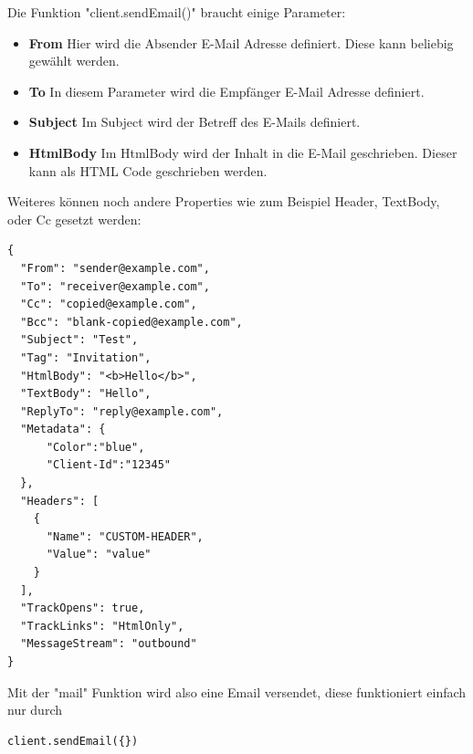 Die Funktion "client.sendEmail()" braucht einige Parameter:

\begin{itemize}
    \item \textbf{From}
        \newline
        Hier wird die Absender E-Mail Adresse definiert. Diese kann beliebig gewählt werden.
    \item \textbf{To}
        \newline
        In diesem Parameter wird die Empfänger E-Mail Adresse definiert.
    \item \textbf{Subject}
        \newline
        Im Subject wird der Betreff des E-Mails definiert.
    \item \textbf{HtmlBody}
        \newline
        Im HtmlBody wird der Inhalt in die E-Mail geschrieben. Dieser kann als HTML Code geschrieben werden.
\end{itemize}


Weiteres können noch andere Properties wie zum Beispiel Header, TextBody, oder Cc gesetzt werden:

\begin{lstlisting}
{
  "From": "sender@example.com",
  "To": "receiver@example.com",
  "Cc": "copied@example.com",
  "Bcc": "blank-copied@example.com",
  "Subject": "Test",
  "Tag": "Invitation",
  "HtmlBody": "<b>Hello</b>",
  "TextBody": "Hello",
  "ReplyTo": "reply@example.com",
  "Metadata": {
      "Color":"blue",
      "Client-Id":"12345"
  },
  "Headers": [
    {
      "Name": "CUSTOM-HEADER",
      "Value": "value"
    }
  ],
  "TrackOpens": true,
  "TrackLinks": "HtmlOnly",
  "MessageStream": "outbound"
}
\end{lstlisting}


Mit der "mail" Funktion wird also eine Email versendet, diese funktioniert einfach nur durch 
\begin{lstlisting}
client.sendEmail({})
\end{lstlisting}
